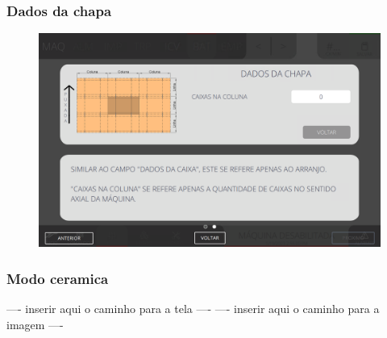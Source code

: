 \newpage
\thispagestyle{fancy}
\vspace*{40 pt}
\subsubsection{\small{Dados da chapa}} \label{sec:telaCalculoAutomaticoGuiasDadosChapa}
\vspace*{\fill}
\begin{figure}[h]
    \centering
    \includegraphics[width=576 px,height=360 px]{src/imagesICV/07-scout/settings/e-7.png}
\end{figure}
\vspace*{\fill}

\newpage
\thispagestyle{fancy}
\vspace*{40 pt}
\subsubsection{\small{Modo ceramica}} \label{sec:telaCalculoAutomaticoGuiasModoCeramica}
---- inserir aqui o caminho para a tela ----
\vspace*{\fill}
---- inserir aqui o caminho para a imagem ----
\vspace*{\fill}

